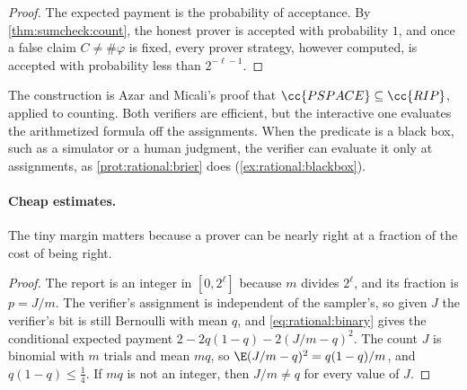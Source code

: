 \begin{refsection}
\begin{proof}
The expected payment is the probability of acceptance. By \cref{thm:sumcheck:count}, the honest prover is accepted with probability $1$, and once a false claim $C\ne\#\varphi$ is fixed, every prover strategy, however computed, is accepted with probability less than $2^{-\ell-1}$.
\end{proof}

The construction is Azar and Micali's proof that $\cc{PSPACE}\subseteq\cc{RIP}$, applied to counting. Both verifiers are efficient, but the interactive one evaluates the arithmetized formula off the assignments. When the predicate is a black box, such as a simulator or a human judgment, the verifier can evaluate it only at assignments, as \cref{prot:rational:brier} does (\cref{ex:rational:blackbox}).

\paragraph{Cheap estimates.} The tiny margin matters because a prover can be nearly right at a fraction of the cost of being right.


\begin{proof}
The report is an integer in $[0,2^\ell]$ because $m$ divides $2^\ell$, and its fraction is $p=J/m$. The verifier's assignment is independent of the sampler's, so given $J$ the verifier's bit is still Bernoulli with mean $q$, and \eqref{eq:rational:binary} gives the conditional expected payment $2-2q(1-q)-2(J/m-q)^2$. The count $J$ is binomial with $m$ trials and mean $mq$, so $\E(J/m-q)^2=q(1-q)/m$, and $q(1-q)\le\frac14$. If $mq$ is not an integer, then $J/m\ne q$ for every value of $J$.
\end{proof}


\end{refsection}
